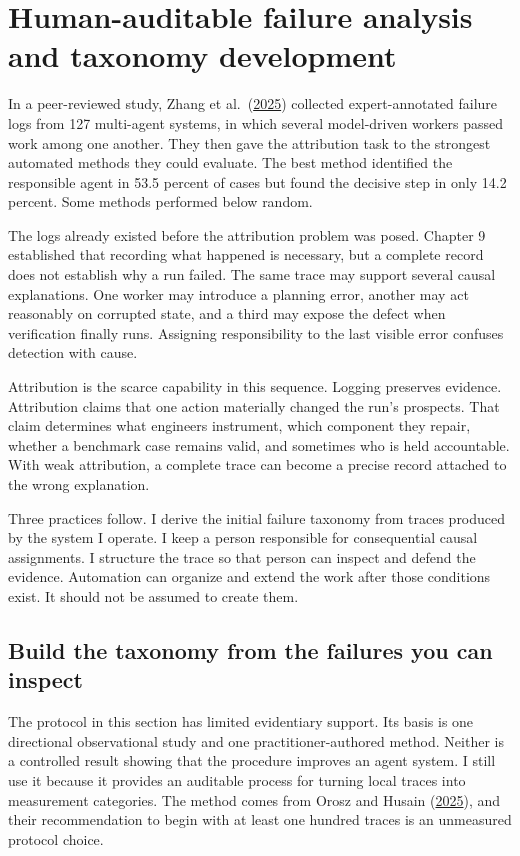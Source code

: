 \chapter{Human-auditable failure analysis and taxonomy development}
\label{ch10-human-auditable-failure-analysis-taxonomy}
In a peer-reviewed study, Zhang et al.~(\href{https://arxiv.org/abs/2505.00212}{2025}) collected expert-annotated failure logs from 127 multi-agent systems, in which several model-driven workers passed work among one another. They then gave the attribution task to the strongest automated methods they could evaluate. The best method identified the responsible agent in 53.5 percent of cases but found the decisive step in only 14.2 percent. Some methods performed below random.

The logs already existed before the attribution problem was posed. Chapter 9 established that recording what happened is necessary, but a complete record does not establish why a run failed. The same trace may support several causal explanations. One worker may introduce a planning error, another may act reasonably on corrupted state, and a third may expose the defect when verification finally runs. Assigning responsibility to the last visible error confuses detection with cause.

Attribution is the scarce capability in this sequence. Logging preserves evidence. Attribution claims that one action materially changed the run's prospects. That claim determines what engineers instrument, which component they repair, whether a benchmark case remains valid, and sometimes who is held accountable. With weak attribution, a complete trace can become a precise record attached to the wrong explanation.

Three practices follow. I derive the initial failure taxonomy from traces produced by the system I operate. I keep a person responsible for consequential causal assignments. I structure the trace so that person can inspect and defend the evidence. Automation can organize and extend the work after those conditions exist. It should not be assumed to create them.

\section{Build the taxonomy from the failures you can inspect}\label{build-the-taxonomy-from-the-failures-you-can-inspect}

The protocol in this section has limited evidentiary support. Its basis is one directional observational study and one practitioner-authored method. Neither is a controlled result showing that the procedure improves an agent system. I still use it because it provides an auditable process for turning local traces into measurement categories. The method comes from Orosz and Husain (\href{https://newsletter.pragmaticengineer.com/p/evals}{2025}), and their recommendation to begin with at least one hundred traces is an unmeasured protocol choice.

